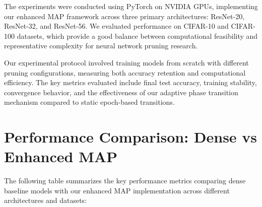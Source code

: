 \documentclass[12pt,a4paper]{report}
\begin{document}
The experiments were conducted using PyTorch on NVIDIA GPUs, implementing our enhanced MAP framework across three primary architectures: ResNet-20, ResNet-32, and ResNet-56. We evaluated performance on CIFAR-10 and CIFAR-100 datasets, which provide a good balance between computational feasibility and representative complexity for neural network pruning research.

Our experimental protocol involved training models from scratch with different pruning configurations, measuring both accuracy retention and computational efficiency. The key metrics evaluated include final test accuracy, training stability, convergence behavior, and the effectiveness of our adaptive phase transition mechanism compared to static epoch-based transitions.

\section{Performance Comparison: Dense vs Enhanced MAP}

The following table summarizes the key performance metrics comparing dense baseline models with our enhanced MAP implementation across different architectures and datasets:

\begin{table}[h!]
\centering
\caption{Performance Comparison: Dense Baseline vs Enhanced MAP}
\label{tab:performance_comparison}
\end{table}
\end{document}
